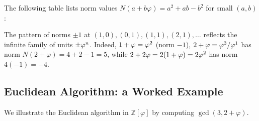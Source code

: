 \begin{example}\label{ex:gs-normtable}
The following table lists norm values \(N(a+b\varphi) = a^2+ab-b^2\)
for small \((a,b)\):

\begin{center}
\end{center}

The pattern of norms \(\pm1\) at \((1,0), (0,1), (1,1), (2,1), \ldots\)
reflects the infinite family of units \(\pm\varphi^{n}\).  Indeed,
\(1+\varphi = \varphi^{2}\) (norm \(-1\)), \(2+\varphi = \varphi^{3}/\varphi^{1}\)
has norm \(N(2+\varphi) = 4+2-1 = 5\), while
\(2+2\varphi = 2(1+\varphi) = 2\varphi^{2}\) has norm \(4(-1) = -4\).
\end{example}

\subsection{Euclidean Algorithm: a Worked Example}
\label{subsec:gs-euclidean-example}

We illustrate the Euclidean algorithm in \(\mathbb{Z}[\varphi]\) by
computing \(\gcd(3, 2+\varphi)\).

